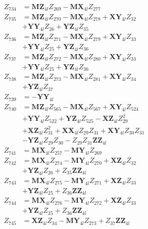 \begin{multicols}{2}
\begin{align}
Z_{734} &= \mathbf{MZ}_{4l}Z_{269} - \mathbf{MX}_{4l}Z_{277} \nonumber \\
Z_{735} &= \mathbf{MZ}_{4l}Z_{270} - \mathbf{MX}_{4l}Z_{278} + \mathbf{XY}_{4l}Z_{32}  \nonumber \\
&+ \mathbf{YY}_{4l}Z_{26} + \mathbf{YZ}_{4l}Z_{35} \nonumber \\
Z_{736} &= \mathbf{MZ}_{4l}Z_{271} - \mathbf{MX}_{4l}Z_{279} + \mathbf{XY}_{4l}Z_{33}  \nonumber \\
&+ \mathbf{YY}_{4l}Z_{25} + \mathbf{YZ}_{4l}Z_{36} \nonumber \\
Z_{737} &= \mathbf{MZ}_{4l}Z_{272} - \mathbf{MX}_{4l}Z_{280} + \mathbf{XY}_{4l}Z_{33}  \nonumber \\
&+ \mathbf{YY}_{4l}Z_{25} + \mathbf{YZ}_{4l}Z_{36} \nonumber \\
Z_{738} &= \mathbf{MZ}_{4l}Z_{273} - \mathbf{MX}_{4l}Z_{281} + \mathbf{XY}_{4l}Z_{34}  \nonumber \\
&+ \mathbf{YZ}_{4l}Z_{37} \nonumber \\
Z_{739} &= -\mathbf{YY}_{4l} \nonumber \\
Z_{740} &= \mathbf{MZ}_{4l}Z_{565} - \mathbf{MX}_{4l}Z_{567} + \mathbf{XY}_{4l}Z_{524}  \nonumber \\
&+ \mathbf{YY}_{4l}Z_{522} + \mathbf{YZ}_{4l}Z_{525} - \mathbf{XZ}_{4l}Z_{29}^2  \nonumber \\
&+ \mathbf{XZ}_{4l}Z_{31}^2 + \mathbf{XX}_{4l}Z_{29}Z_{31} + \mathbf{XY}_{4l}Z_{30}Z_{31}  \nonumber \\
&- \mathbf{YZ}_{4l}Z_{29}Z_{30} - Z_{29}Z_{31}\mathbf{ZZ}_{4l} \nonumber \\
Z_{741} &= \mathbf{MX}_{4l}Z_{257} - \mathbf{MY}_{4l}Z_{269} \nonumber \\
Z_{742} &= \mathbf{MX}_{4l}Z_{274} - \mathbf{MY}_{4l}Z_{270} + \mathbf{XZ}_{4l}Z_{32}  \nonumber \\
&+ \mathbf{YZ}_{4l}Z_{26} + Z_{35}\mathbf{ZZ}_{4l} \nonumber \\
Z_{743} &= \mathbf{MX}_{4l}Z_{275} - \mathbf{MY}_{4l}Z_{271} + \mathbf{XZ}_{4l}Z_{33}  \nonumber \\
&+ \mathbf{YZ}_{4l}Z_{25} + Z_{36}\mathbf{ZZ}_{4l} \nonumber \\
Z_{744} &= \mathbf{MX}_{4l}Z_{276} - \mathbf{MY}_{4l}Z_{272} + \mathbf{XZ}_{4l}Z_{33}  \nonumber \\
&+ \mathbf{YZ}_{4l}Z_{25} + Z_{36}\mathbf{ZZ}_{4l} \nonumber \\
Z_{745} &= \mathbf{XZ}_{4l}Z_{34} - \mathbf{MY}_{4l}Z_{273} + Z_{37}\mathbf{ZZ}_{4l} \nonumber \\

\end{align}
\end{multicols}
